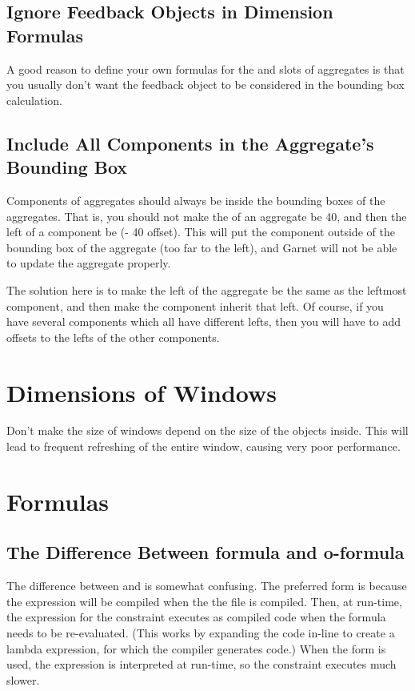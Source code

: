 \subsection{Ignore Feedback Objects in Dimension Formulas}

A good reason to define your own formulas for the  and
 slots of aggregates is that you usually don't want the
feedback object to be considered in the bounding box calculation.


\subsection{Include All Components in the Aggregate's Bounding Box}

Components of aggregates should always be inside the bounding boxes
of the aggregates.  That is, you should not make the  of an
aggregate be 40, and then the left of a component be
(- 40 offset).  This will put the component outside of the bounding
box of the aggregate (too far to the left), and Garnet will not be
able to update the aggregate properly.

The solution here is to make the left of the aggregate be the same as
the leftmost component, and then make the component
inherit that left.  Of course, if you have several components which all
have different lefts, then you will have to add offsets to the lefts
of the other components.


\section{Dimensions of Windows}

Don't make the size of windows depend on the size of the objects
inside.  This will lead to frequent refreshing of the entire window,
causing very poor performance.


\section{Formulas}


\subsection{The Difference Between formula and o-formula}
\label{formula-difference}

The difference between  and  is somewhat
confusing.  The preferred form is 
because the expression will be compiled when the the file is compiled.
Then, at run-time, the expression for the constraint executes as
compiled code when the formula needs to be re-evaluated.  (This works
by expanding the code in-line to create a lambda expression, for which
the compiler generates code.)  When the 
form is used, the expression is interpreted at run-time, so the
constraint executes much slower.

